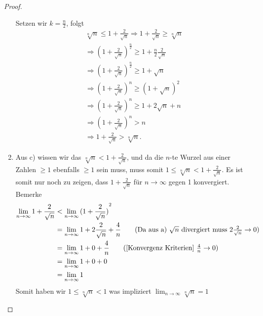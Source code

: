 \documentclass{../problemset}
\begin{document}
\begin{problem}
\begin{proof}
\begin{enumerate}
		      Setzen wir $k = \frac{n}{2}$, folgt
		      \begin{align*}
			      \sqrt[n]{n} \leq 1 + \frac{2}{\sqrt{n}} \Longrightarrow 1 + \frac{2}{\sqrt{n}} \ge \sqrt[n]{n} \\
			      \Longrightarrow {(1 + \frac{2}{\sqrt{n}})}^{\frac{n}{2}} \ge 1 + \frac{n}{2}\frac{2}{\sqrt{n}} \\
			      \Longrightarrow {(1 + \frac{2}{\sqrt{n}})}^{\frac{n}{2}} \ge 1 + \sqrt{n}                      \\
			      \Longrightarrow {(1 + \frac{2}{\sqrt{n}})}^n \ge {(1 + \sqrt{n})}^{2}                          \\
			      \Longrightarrow {(1 + \frac{2}{\sqrt{n}})}^n \ge 1 + 2\sqrt{n} + n                             \\
			      \Longrightarrow {(1 + \frac{2}{\sqrt{n}})}^n > n                                               \\
			      \Longrightarrow 1 + \frac{2}{\sqrt{n}} > \sqrt[n]{n}.
		      \end{align*}
		      \checkmark
		\item Aus c) wissen wir das $\sqrt[n]{n} < 1 + \frac{2}{\sqrt{n}}$, und da die $n$-te Wurzel aus einer Zahlen $\ge 1$ ebenfalls $\ge 1$ sein muss, muss somit $1 \le \sqrt[n]{n} < 1 + \frac{2}{\sqrt{n}}$.
		      Es ist somit nur noch zu zeigen, dass $1 + \frac{2}{\sqrt{n}}$ für $n \to \infty$ gegen 1 konvergiert.
		      Bemerke
		      \begin{align*}
			      \lim_{n \to \infty} 1 + \frac{2}{\sqrt{n}} & < \lim_{n \to \infty} {( 1 + \frac{2}{\sqrt{n}})}^2                                                                                 \\
			                                                 & = \lim_{n \to \infty} 1 + 2\frac{2}{\sqrt{n}} + \frac{4}{n} \tag{Da aus a) $\sqrt{n}$ divergiert muss $ 2\frac{2}{\sqrt{n}} \to 0$} \\
			                                                 & = \lim_{n \to \infty} 1 + 0 + \frac{4}{n} \tag{[Konvergenz Kriterien] $\frac{4}{n} \to 0$}                                          \\
			                                                 & = \lim_{n \to \infty} 1 + 0 + 0                                                                                                     \\
			                                                 & = \lim_{n \to \infty} 1
		      \end{align*}
		      Somit haben wir $1 \le \sqrt[n]{n} < 1$ was impliziert $\lim_{n \to \infty} \sqrt[n]{n} = 1$
		      \checkmark
	\end{enumerate}
\end{proof}
\end{problem}
\end{document}
